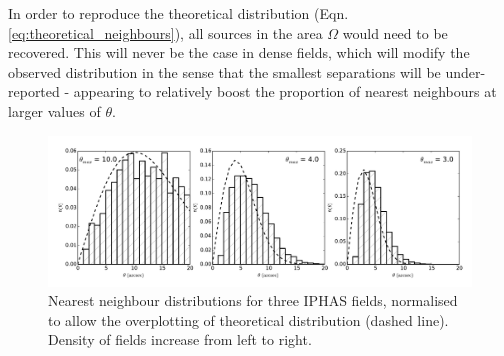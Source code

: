 \documentclass[a4paper,useAMS,usenatbib]{mn2e}
\begin{document}


In order to reproduce the theoretical distribution (Eqn. \ref{eq:theoretical_neighbours}), all sources in 
the area $\Omega$ would need to be recovered. This will never be the case in dense fields, which will modify the 
observed distribution in the sense that the smallest separations will be under-reported - appearing to relatively
boost the proportion of nearest neighbours at larger values of $\theta$.

\begin{figure}
\begin{center}
\includegraphics[width=1\textwidth]{figures/neighbours_aquila.pdf} 
\caption{\footnotesize Nearest neighbour distributions for three IPHAS fields, 
normalised to allow the overplotting of theoretical distribution (dashed line).
 Density of fields increase from left to right.}
\label{fig:iphasfield_neighbours}
\end{center}
\end{figure}
\end{document}
